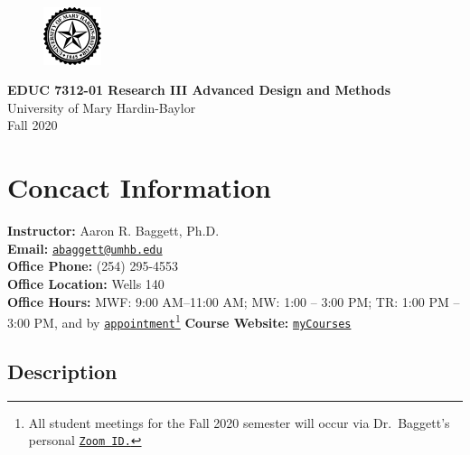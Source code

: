 \documentclass[
]{article}
\author{}
\date{\vspace{-2.5em}}
\begin{document}
\makeatletter
\setlength{\@fptop}{0pt}
\makeatother

\begin{figure}[t!]
  \centering
  \includegraphics[keepaspectratio, width=0.15\textwidth]{./Figs/Seal-Black}
\end{figure}


\begin{center}
{\LARGE{\bf{EDUC 7312-01 Research III Advanced Design and Methods}}}\\
{\small{University of Mary Hardin-Baylor}}\\
\vspace{.15in}
{\large{Fall 2020}}
\end{center}

\thispagestyle{empty}

\vspace{3mm}

\vspace{.25in}

\section{Concact Information}

\textbf{Instructor:} Aaron R. Baggett, Ph.D.\\
\textbf{Email:}
\texttt{\href{mailto:abaggett@umhb.edu}{abaggett@umhb.edu}}\\
\textbf{Office Phone:} (254) 295-4553\\
\textbf{Office Location:} Wells 140\\
\textbf{Office Hours:} MWF: 9:00 AM--11:00 AM; MW: 1:00 -- 3:00 PM; TR:
1:00 PM -- 3:00 PM, and by
\texttt{\href{mailto:abaggett@umhb.edu}{appointment}}\footnote{All
  student meetings for the Fall 2020 semester will occur via
  Dr.~Baggett's personal
  \texttt{\href{https://umhb.zoom.us/j/5393191651}{Zoom ID.}}}
\textbf{Course Website:}
\texttt{\href{https://mycourses.umhb.edu/courses/23592}{myCourses}}

\subsection{Description}
\end{document}
